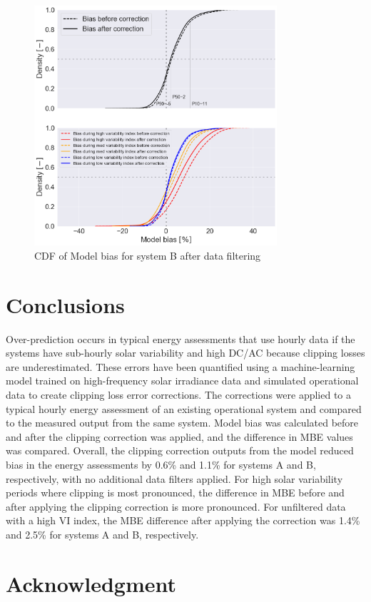 \documentclass[conference]{IEEEtran}
\begin{document}
\begin{figure}[htbp]
\centerline{\includegraphics[width=9cm]{PAW_ModelBias_breakdown_AFTER_filter_CDF_v4.png}}
\caption{CDF of Model bias for system B after data filtering}
\label{fig:PAW-modelbias-after-filter-cdf}
\end{figure}

\section{Conclusions}
Over-prediction occurs in typical energy assessments that use hourly data if the systems have sub-hourly solar variability and high DC/AC because clipping losses are underestimated. These errors have been quantified using a machine-learning model trained on high-frequency solar irradiance data and simulated operational data to create clipping loss error corrections. The corrections were applied to a typical hourly energy assessment of an existing operational system and compared to the measured output from the same system. Model bias was calculated before and after the clipping correction was applied, and the difference in MBE values was compared. Overall, the clipping correction outputs from the model reduced bias in the energy assessments by 0.6\% and 1.1\% for systems A and B,  respectively, with no additional data filters applied. For high solar variability periods where clipping is most pronounced, the difference in MBE before and after applying the clipping correction is more pronounced. For unfiltered data with a high VI index, the MBE difference after applying the correction was 1.4\% and 2.5\% for systems A and B, respectively. 

\section*{Acknowledgment}
\end{document}
